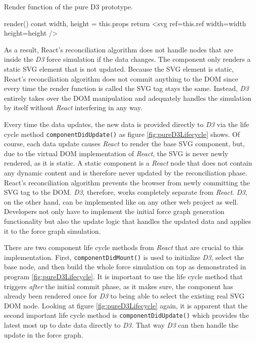 \begin{program}
\caption{Render function of the pure D3 prototype.}
\label{prog:pureD3render}
\begin{JsCode}
render() {
  const { width, height } = this.props
  return <svg ref={this.ref} width={width} height={height} />
}
\end{JsCode}
\end{program}

As a result, React's reconciliation algorithm does not handle nodes that are inside the \emph{D3} force simulation if the data changes. The component only renders a static SVG element that is not updated. Because the SVG element is static, React's reconciliation algorithm does not commit anything to the DOM since every time the render function is called the SVG tag stays the same. Instead, \emph{D3} entirely takes over the DOM manipulation and adequately handles the simulation by itself without \emph{React} interfering in any way.

Every time the data updates, the new data is provided directly to \emph{D3} via the life cycle method \texttt{componentDidUpdate()} as figure \ref{fig:pureD3Lifecycle} shows. Of course, each data update causes \emph{React} to render the base SVG component, but, due to the virtual DOM implementation of \emph{React}, the SVG is never newly rendered, as it is static. A static component is a \emph{React} node that does not contain any dynamic content and is therefore never updated by the reconciliation phase. React's reconciliation algorithm prevents the browser from newly committing the SVG tag to the DOM. \emph{D3}, therefore, works completely separate from \emph{React}. \emph{D3}, on the other hand, can be implemented like on any other web project as well. Developers not only have to implement the initial force graph generation functionality but also the update logic that handles the updated data and applies it to the force graph simulation.

There are two component life cycle methods from \emph{React} that are crucial to this implementation. First, \texttt{componentDidMount()} is used to initialize \emph{D3}, select the base node, and then build the whole force simulation on top as demonstrated in program \ref{fig:pureD3Lifecycle}. It is important to use the life cycle method that triggers \emph{after} the initial commit phase, as it makes sure, the component has already been rendered once for \emph{D3} to being able to select the existing real SVG DOM node. Looking at figure \ref{fig:pureD3Lifecycle} again, it is apparent that the second important life cycle method is \texttt{componentDidUpdate()} which provides the latest most up to date data directly to \emph{D3}. That way \emph{D3} can then handle the update in the force graph.

